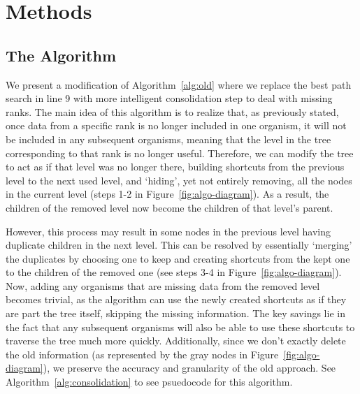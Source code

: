 \section{Methods} \label{sec:methods}





\subsection{The Algorithm} \label{sec:algorithm}

We present a modification of Algorithm~\ref{alg:old} where we replace the best path search in line 9 with more intelligent consolidation step to deal with missing ranks. The main idea of this algorithm is to realize that, as previously stated, once data from a specific rank is no longer included in one organism, it will not be included in any subsequent organisms, meaning that the level in the tree corresponding to that rank is no longer useful. Therefore, we can modify the tree to act as if that level was no longer there, building shortcuts from the previous level to the next used level, and `hiding', yet not entirely removing, all the nodes in the current level (steps 1-2 in Figure~\ref{fig:algo-diagram}). As a result, the children of the removed level now become the children of that level's parent. 



However, this process may result in some nodes in the previous level having duplicate children in the next level. This can be resolved by essentially `merging' the duplicates by choosing one to keep and creating shortcuts from the kept one to the children of the removed one (see steps 3-4 in Figure~\ref{fig:algo-diagram}). Now, adding any organisms that are missing data from the removed level becomes trivial, as the algorithm can use the newly created shortcuts as if they are part the tree itself, skipping the missing information. The key savings lie in the fact that any subsequent organisms will also be able to use these shortcuts to traverse the tree much more quickly. Additionally, since we don't exactly delete the old information (as represented by the gray nodes in Figure~\ref{fig:algo-diagram}), we preserve the accuracy and granularity of the old approach. See Algorithm~\ref{alg:consolidation} to see psuedocode for this algorithm.



